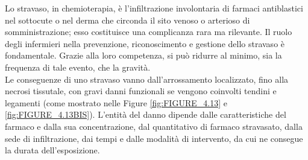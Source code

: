 Lo stravaso, in chemioterapia, è l’infiltrazione involontaria di farmaci antiblastici nel sottocute o nel derma che 
circonda il sito venoso o arterioso di somministrazione; esso costituisce una complicanza rara ma rilevante.
Il ruolo degli infermieri nella prevenzione, riconoscimento e gestione dello stravaso è fondamentale. Grazie alla 
loro competenza, si può ridurre al minimo, sia la frequenza di tale evento, che la gravità.\\ Le conseguenze di uno 
stravaso vanno dall’arrossamento localizzato, fino alla necrosi tissutale, con gravi danni funzionali se vengono 
coinvolti tendini e legamenti (come mostrato nelle Figure \ref{fig:FIGURE_4.13} e \ref{fig:FIGURE_4.13BIS}). 
L’entità del danno dipende dalle caratteristiche del farmaco e dalla sua 
concentrazione, dal quantitativo di farmaco stravasato, dalla sede di infiltrazione, dai tempi e dalle modalità 
di intervento, da cui ne consegue la durata dell’esposizione\cite{STRAVASOTOSCANA}.\\

